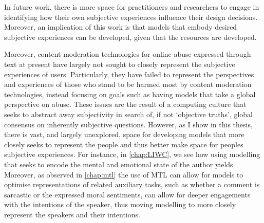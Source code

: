 In future work, there is more space for practitioners and researchers to engage in identifying how their own subjective experiences influence their design decisions.
Moreover, an implication of this work is that models that embody desired subjective experiences can be developed, given that the resources  are developed.

Moreover, content moderation technologies for online abuse expressed through text at present have largely not sought to closely represent the subjective experiences of users.
Particularly, they have failed to represent the perspectives and experiences of those who stand to be harmed most by content moderation technologies, instead focusing on goals such as having models that take a global perspective on abuse.
These issues are the result of a computing culture that seeks to abstract away subjectivity in search of, if not `objective truths', global consensus on inherently subjective questions.
However, as I show in this thesis, there is vast, and largely unexplored, space for developing models that more closely seeks to represent the people and thus better make space for peoples subjective experiences.
For instance, in \cref{chap:LIWC}, we see how using modelling that seeks to encode the mental and emotional state of the author yields 
Moreover, as observed in \cref{chap:mtl} the use of MTL can allow for models to optimise representations of related auxiliary tasks, such as whether a comment is sarcastic or the expressed moral sentiments, can allow for deeper engagements with the intentions of the speaker, thus moving modelling to more closely represent the speakers and their intentions.

